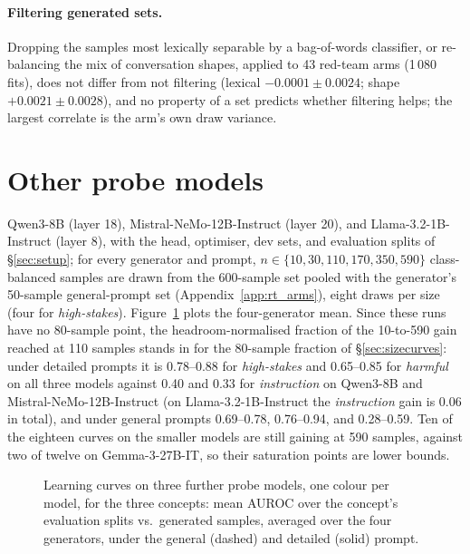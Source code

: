 \documentclass{article} %
\newcommand{\hs}{\emph{high-stakes}}
\newcommand{\harm}{\emph{harmful}}
\newcommand{\instr}{\emph{instruction}}
\begin{document}
\paragraph{Filtering generated sets.}
Dropping the samples most lexically separable by a bag-of-words classifier, or re-balancing the mix of conversation shapes, applied to 43 red-team arms (1\,080 fits), does not differ from not filtering (lexical $-0.0001\pm0.0024$; shape $+0.0021\pm0.0028$), and no property of a set predicts whether filtering helps; the largest correlate is the arm's own draw variance.

\section{Other probe models}
\label{app:models}
Qwen3-8B (layer 18), Mistral-NeMo-12B-Instruct (layer 20), and Llama-3.2-1B-Instruct (layer 8), with the head, optimiser, dev sets, and evaluation splits of \S\ref{sec:setup}; for every generator and prompt, $n\in\{10,30,110,170,350,590\}$ class-balanced samples are drawn from the 600-sample set pooled with the generator's 50-sample general-prompt set (Appendix~\ref{app:rt_arms}), eight draws per size (four for \hs{}). Figure~\ref{fig:models} plots the four-generator mean. Since these runs have no 80-sample point, the headroom-normalised fraction of the 10-to-590 gain reached at 110 samples stands in for the 80-sample fraction of \S\ref{sec:sizecurves}: under detailed prompts it is 0.78--0.88 for \hs{} and 0.65--0.85 for \harm{} on all three models against 0.40 and 0.33 for \instr{} on Qwen3-8B and Mistral-NeMo-12B-Instruct (on Llama-3.2-1B-Instruct the \instr{} gain is 0.06 in total), and under general prompts 0.69--0.78, 0.76--0.94, and 0.28--0.59. Ten of the eighteen curves on the smaller models are still gaining at 590 samples, against two of twelve on Gemma-3-27B-IT, so their saturation points are lower bounds.

\begin{figure}[H]
  \centering
  
  \caption{Learning curves on three further probe models, one colour per model, for the three concepts: mean AUROC over the concept's evaluation splits vs.\ generated samples, averaged over the four generators, under the general (dashed) and detailed (solid) prompt.}
  \label{fig:models}
\end{figure}
\end{document}
